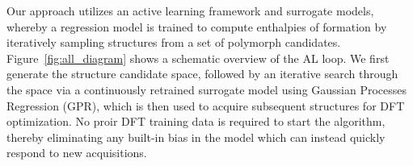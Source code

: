 %
%
%
%



%
%
Our approach utilizes an active learning framework and surrogate models,
whereby a regression model is trained to compute enthalpies of formation by iteratively sampling structures from a set of polymorph candidates.
%
Figure~\ref{fig:all_diagram} shows a schematic overview of the AL loop.
%
We first generate the structure candidate space, followed by an iterative search through the space via a continuously retrained surrogate model using Gaussian Processes Regression (GPR),
which is then used to acquire subsequent structures for DFT optimization.
%
No proir DFT training data is required to start the algorithm, thereby eliminating any built-in bias in the model which can instead quickly respond to new acquisitions.


